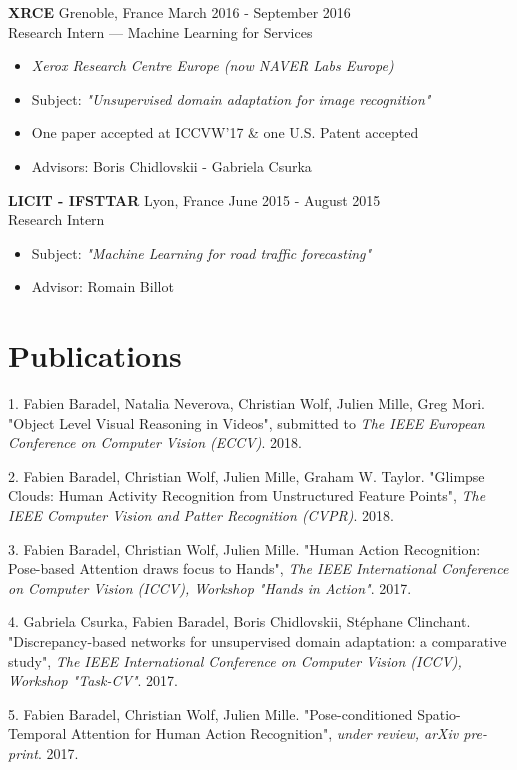 \documentclass[10pt]{res} %
\begin{document}
\begin{resume}
\textbf{XRCE} \hfill Grenoble, France \hfill March 2016 - September 2016 \\
Research Intern --- Machine Learning for Services
\begin{itemize}
\item \textit{Xerox Research Centre Europe (now NAVER Labs Europe)}
\item Subject: \textit{"Unsupervised domain adaptation for image recognition"}
\item One paper accepted at ICCVW'17 \& one U.S. Patent accepted
\item Advisors: Boris Chidlovskii - Gabriela Csurka
\end{itemize}

\textbf{LICIT - IFSTTAR} \hfill Lyon, France \hfill June 2015 - August 2015 \\
Research Intern
\begin{itemize}
\item Subject: \textit{"Machine Learning for road traffic forecasting"}
\item Advisor: Romain Billot
\end{itemize}



\section{\large Publications} 
1. Fabien Baradel, Natalia Neverova, Christian Wolf, Julien Mille, Greg Mori. "Object Level Visual Reasoning in Videos", submitted to \textit{The IEEE European Conference on Computer Vision (ECCV)}. 2018.

2. Fabien Baradel, Christian Wolf, Julien Mille, Graham W. Taylor. "Glimpse Clouds: Human Activity Recognition from Unstructured Feature Points", \textit{The IEEE Computer Vision and Patter Recognition (CVPR)}. 2018.

3. Fabien Baradel, Christian Wolf, Julien Mille. "Human Action Recognition: Pose-based Attention draws focus to Hands", \textit{The IEEE International Conference on Computer Vision (ICCV), Workshop "Hands in Action"}. 2017.

4. Gabriela Csurka, Fabien Baradel, Boris Chidlovskii, Stéphane Clinchant. "Discrepancy-based networks for unsupervised domain adaptation: a comparative study",  \textit{The IEEE International Conference on Computer Vision (ICCV), Workshop "Task-CV"}. 2017.

5. Fabien Baradel, Christian Wolf, Julien Mille. "Pose-conditioned Spatio-Temporal Attention for Human Action Recognition",  \textit{under review, arXiv pre-print}. 2017.


\end{resume}
\end{document}
